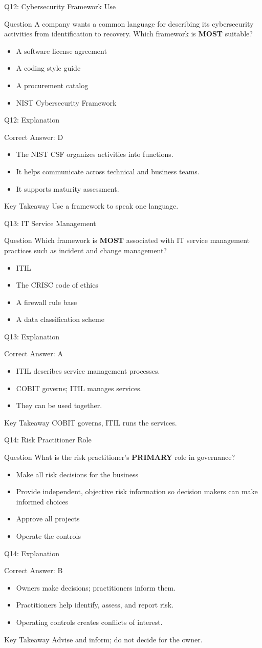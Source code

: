 \documentclass[aspectratio=169]{beamer}
\newcommand{\hq}[7]{%
	\begin{frame}{Q#1: #2}
		\begin{block}{Question}
			#3
		\end{block}
		\begin{itemize}
			#4
		\end{itemize}
	\end{frame}
	\begin{frame}{Q#1: Explanation}
		\begin{block}{Correct Answer: #5}
			\begin{itemize}
				#6
			\end{itemize}
		\end{block}
		\begin{alertblock}{Key Takeaway}
			#7
		\end{alertblock}
	\end{frame}
}
\begin{document}
	\hq{12}{Cybersecurity Framework Use}
	{A company wants a common language for describing its cybersecurity activities from identification to recovery. Which framework is \textbf{MOST} suitable?}
	{\item[\textbf{(A)}] A software license agreement
		\item[\textbf{(B)}] A coding style guide
		\item[\textbf{(C)}] A procurement catalog
		\item[\textbf{(D)}] NIST Cybersecurity Framework}
	{D}
	{\item The NIST CSF organizes activities into functions.
		\item It helps communicate across technical and business teams.
		\item It supports maturity assessment.}
	{Use a framework to speak one language.}
	
	\hq{13}{IT Service Management}
	{Which framework is \textbf{MOST} associated with IT service management practices such as incident and change management?}
	{\item[\textbf{(A)}] ITIL
		\item[\textbf{(B)}] The CRISC code of ethics
		\item[\textbf{(C)}] A firewall rule base
		\item[\textbf{(D)}] A data classification scheme}
	{A}
	{\item ITIL describes service management processes.
		\item COBIT governs; ITIL manages services.
		\item They can be used together.}
	{COBIT governs, ITIL runs the services.}
	
	\hq{14}{Risk Practitioner Role}
	{What is the risk practitioner's \textbf{PRIMARY} role in governance?}
	{\item[\textbf{(A)}] Make all risk decisions for the business
		\item[\textbf{(B)}] Provide independent, objective risk information so decision makers can make informed choices
		\item[\textbf{(C)}] Approve all projects
		\item[\textbf{(D)}] Operate the controls}
	{B}
	{\item Owners make decisions; practitioners inform them.
		\item Practitioners help identify, assess, and report risk.
		\item Operating controls creates conflicts of interest.}
	{Advise and inform; do not decide for the owner.}
	
\end{document}
